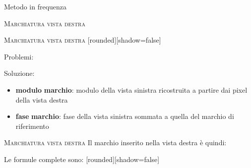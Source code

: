 \documentclass{beamer}
\begin{document}
\begin{section}{Metodo in frequenza}
\begin{frame}[t]{\textsc{Marchiatura vista destra}}
\end{frame}

\begin{frame}[t]{\textsc{Marchiatura vista destra}}
[rounded][shadow=false]
\begin{block}{Problemi:}
\end{block}
\begin{block}{Soluzione:}
		\begin{itemize}
		\item \textbf{modulo} \textbf{marchio}: modulo della vista sinistra ricostruita a partire dai pixel della vista destra
		\item \textbf{fase} \textbf{marchio}: fase della vista sinistra sommata a quella del marchio di riferimento
		\end{itemize}
\end{block}

\end{frame}


\begin{frame}[t]{\textsc{Marchiatura vista destra}}
\vspace{5mm}
Il marchio inserito nella vista destra \`{e} quindi:
\begin{center}
\end{center}
\vspace{3mm}
Le formule complete sono:
\vspace{3mm}
[rounded][shadow=false]
\begin{block}{}
\begin{center}
\end{center}
\end{block}
\end{frame}
\end{section}
\end{document}
